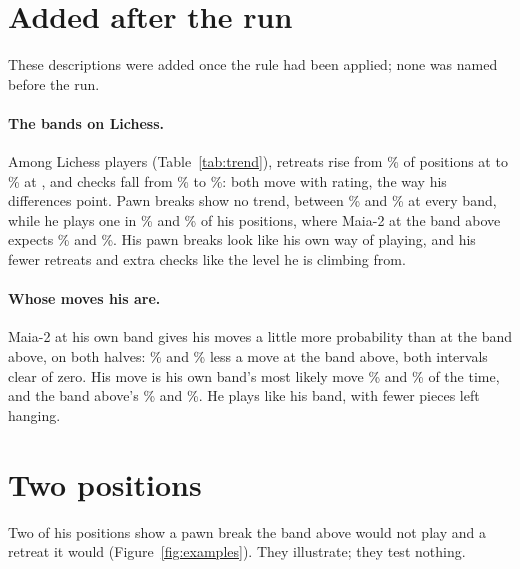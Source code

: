 \documentclass[11pt]{article}
\begin{document}
\section{Added after the run}

These descriptions were added once the rule had been applied; none was named before the run.

\TrendTable

\paragraph{The bands on Lichess.} Among Lichess players (Table~\ref{tab:trend}), retreats rise
from \LiRetreatLow\% of positions at \BandLowest{} to \LiRetreatHigh\% at \BandHighest, and checks
fall from \LiCheckLow\% to \LiCheckHigh\%: both move with rating, the way his differences point.
Pawn breaks show no trend, between \LiBreakMin\% and \LiBreakMax\% at every band, while he plays
one in \HisBreakFirst\% and \HisBreakSecond\% of his positions, where Maia-2 at the band above
expects \MaiaBreakFirst\% and \MaiaBreakSecond\%. His pawn breaks look like his own way of
playing, and his fewer retreats and extra checks like the level he is climbing from.

\paragraph{Whose moves his are.} Maia-2 at his own band gives his moves a little more probability
than at the band above, on both halves: \LikeFirst\% and \LikeSecond\% less a move at the band
above, both intervals clear of zero. His move is his own band's most likely move \TopHisFirst\%
and \TopHisSecond\% of the time, and the band above's \TopAboveFirst\% and \TopAboveSecond\%. He
plays like his band, with fewer pieces left hanging.

\section{Two positions}

Two of his positions show a pawn break the band above would not play and a retreat it would
(Figure~\ref{fig:examples}). They illustrate; they test nothing.
\end{document}
